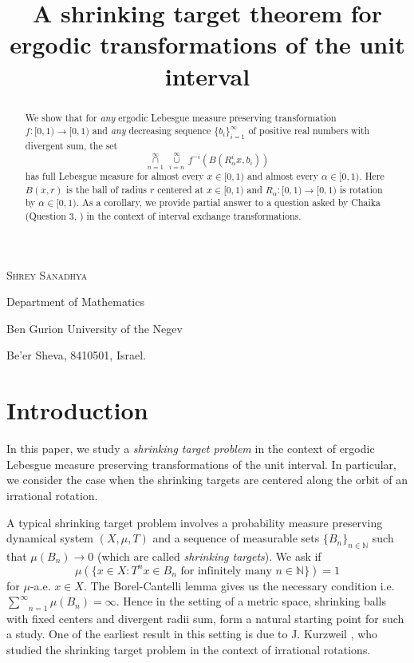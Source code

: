\documentclass[11pt, english, reqno]{amsart}
\title[A shrinking target theorem for ergodic transformations of the unit interval] %
      {A shrinking target theorem for ergodic transformations of the unit interval}
\author[Shrey Sanadhya]{}
\theoremstyle{definition}
\theoremstyle{remark}
\numberwithin{equation}{section}
\numberwithin{equation}{section}
\newcommand{\N}{{\mathbb N}}
\newcommand{\LS}{\ensuremath{\underset{n=1}{\overset{\infty}{\cap}} \, {\underset{i=n}{\overset{\infty}{\cup}}}\,}}
\begin{document}
\maketitle

\centerline{\scshape Shrey Sanadhya}
\medskip
{\footnotesize
 \centerline{Department of Mathematics}
   \centerline{Ben Gurion University of the Negev}
   \centerline{Be’er Sheva, 8410501, Israel.}
} %

\bigskip


\begin{abstract} We show that for \textit{any} ergodic Lebesgue measure preserving transformation $f: [0,1) \rightarrow [0,1)$ and \textit{any} decreasing sequence $\{b_i\}_{i=1}^{\infty}$ of positive real numbers with divergent sum, the set $$\LS f^{-i}(B (R_{\alpha}^{i} x,b_i))$$ has full Lebesgue measure for almost every $x \in [0,1)$ and almost every $\alpha \in [0,1)$. Here $B(x,r)$ is the ball of radius $r$ centered at $x \in [0,1)$ and $R_{\alpha}: [0,1) \rightarrow [0,1)$ is rotation by $\alpha \in [0,1)$. As a corollary, we provide partial answer to a question asked by Chaika (Question $3$, \cite{Chaika_2011}) in the context of interval exchange transformations. 

\end{abstract}

\section{ Introduction}\label{sect Intro} In this paper, we study a \textit{shrinking target problem} in the context of ergodic Lebesgue measure preserving transformations of the unit interval. In particular, we consider the case when the shrinking targets are centered along the orbit of an irrational rotation.

A typical shrinking target problem involves a probability measure preserving dynamical system $(X,\mu, T)$ and a sequence of measurable sets $\{B_n\}_{n \in \N}$ such that $\mu(B_n) \rightarrow 0$ (which are called \textit{shrinking targets}). We ask if  $$\mu (\{x \in X : T^n x \in B_n \,\, \textrm{for infinitely many}\,\, n\in \mathbb{N} \}) = 1$$ for $\mu$-a.e. $x \in X$. The Borel-Cantelli lemma gives us the necessary condition i.e. $\underset{n=1}{\overset{\infty}{\sum}} \mu(B_n)=\infty$. Hence in the setting of a metric space, shrinking balls with fixed centers and divergent radii sum, form a natural starting point for such a study. One of the earliest result in this setting is due to J. Kurzweil \cite{Kurzweil_1955}, who studied the shrinking target problem in the context of irrational rotations. 
\end{document}
